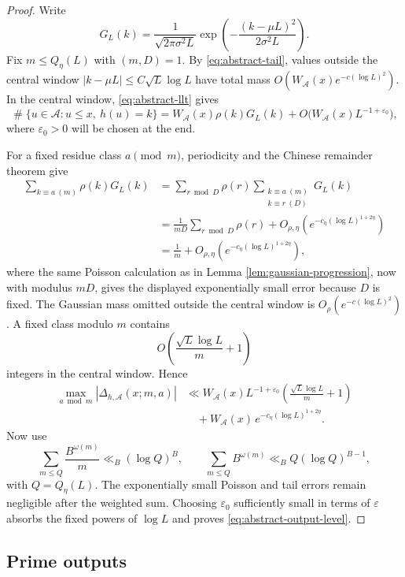 \documentclass[11pt,reqno]{amsart}
\theoremstyle{plain}
\theoremstyle{definition}
\newcommand{\eps}{\varepsilon}
\newcommand{\1}{\mathbf 1}
\DeclareMathOperator{\Card}{\#}
\begin{document}
\begin{proof}
Write
\[
 G_L(k)=\frac1{\sqrt{2\pi\sigma^2L}}
 \exp\!\left(-\frac{(k-\mu L)^2}{2\sigma^2L}\right).
\]
Fix $m\le Q_\eta(L)$ with $(m,D)=1$.  By \eqref{eq:abstract-tail}, values outside the central window $|k-\mu L|\le C\sqrt L\log L$ have total mass $O(W_{\mathcal A}(x)e^{-c(\log L)^2})$.  In the central window, \eqref{eq:abstract-llt} gives
\[
 \Card\{u\in\mathcal A:u\le x,\ h(u)=k\}
 =W_{\mathcal A}(x)\rho(k)G_L(k)
 +O\bigl(W_{\mathcal A}(x)L^{-1+\eps_0}\bigr),
\]
where $\eps_0>0$ will be chosen at the end.

For a fixed residue class $a\pmod m$, periodicity and the Chinese remainder theorem give
\begin{align*}
 \sum_{k\equiv a\ (m)}\rho(k)G_L(k)
 &=\sum_{r\bmod D}\rho(r)
   \sum_{\substack{k\equiv a\ (m)\\k\equiv r\ (D)}}G_L(k)\\
 &=\frac1{mD}\sum_{r\bmod D}\rho(r)
   +O_{\rho,\eta}(e^{-c_\eta(\log L)^{1+2\eta}})\\
 &=\frac1m+O_{\rho,\eta}(e^{-c_\eta(\log L)^{1+2\eta}}),
\end{align*}
where the same Poisson calculation as in Lemma \ref{lem:gaussian-progression}, now with modulus $mD$, gives the displayed exponentially small error because $D$ is fixed.  The Gaussian mass omitted outside the central window is $O_\rho(e^{-c(\log L)^2})$.  A fixed class modulo $m$ contains
\[
 O\!\left(\frac{\sqrt L\log L}{m}+1\right)
\]
integers in the central window.  Hence
\[
\begin{aligned}
 \max_{a\bmod m}|\Delta_{h,\mathcal A}(x;m,a)|
 &\ll W_{\mathcal A}(x)L^{-1+\eps_0}
 \left(\frac{\sqrt L\log L}{m}+1\right)\\
 &\quad+W_{\mathcal A}(x)\,e^{-c_\eta(\log L)^{1+2\eta}}.
\end{aligned}
\]
Now use
\[
 \sum_{m\le Q}\frac{B^{\omega(m)}}m\ll_B(\log Q)^B,
 \qquad
 \sum_{m\le Q}B^{\omega(m)}\ll_BQ(\log Q)^{B-1},
\]
with $Q=Q_\eta(L)$.  The exponentially small Poisson and tail errors remain negligible after the weighted sum.  Choosing $\eps_0$ sufficiently small in terms of $\eps$ absorbs the fixed powers of $\log L$ and proves \eqref{eq:abstract-output-level}.
\end{proof}

\subsection{Prime outputs}
\end{document}
